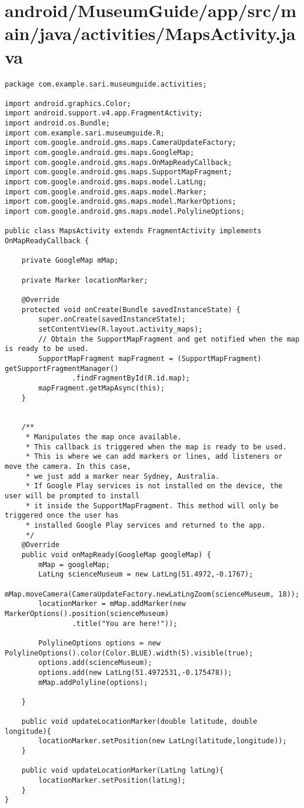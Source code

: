 \section{android/MuseumGuide/app/src/main/java/activities/MapsActivity.java}
\begin{lstlisting}package com.example.sari.museumguide.activities;

import android.graphics.Color;
import android.support.v4.app.FragmentActivity;
import android.os.Bundle;
import com.example.sari.museumguide.R;
import com.google.android.gms.maps.CameraUpdateFactory;
import com.google.android.gms.maps.GoogleMap;
import com.google.android.gms.maps.OnMapReadyCallback;
import com.google.android.gms.maps.SupportMapFragment;
import com.google.android.gms.maps.model.LatLng;
import com.google.android.gms.maps.model.Marker;
import com.google.android.gms.maps.model.MarkerOptions;
import com.google.android.gms.maps.model.PolylineOptions;

public class MapsActivity extends FragmentActivity implements OnMapReadyCallback {

    private GoogleMap mMap;

    private Marker locationMarker;

    @Override
    protected void onCreate(Bundle savedInstanceState) {
        super.onCreate(savedInstanceState);
        setContentView(R.layout.activity_maps);
        // Obtain the SupportMapFragment and get notified when the map is ready to be used.
        SupportMapFragment mapFragment = (SupportMapFragment) getSupportFragmentManager()
                .findFragmentById(R.id.map);
        mapFragment.getMapAsync(this);
    }


    /**
     * Manipulates the map once available.
     * This callback is triggered when the map is ready to be used.
     * This is where we can add markers or lines, add listeners or move the camera. In this case,
     * we just add a marker near Sydney, Australia.
     * If Google Play services is not installed on the device, the user will be prompted to install
     * it inside the SupportMapFragment. This method will only be triggered once the user has
     * installed Google Play services and returned to the app.
     */
    @Override
    public void onMapReady(GoogleMap googleMap) {
        mMap = googleMap;
        LatLng scienceMuseum = new LatLng(51.4972,-0.1767);
        mMap.moveCamera(CameraUpdateFactory.newLatLngZoom(scienceMuseum, 18));
        locationMarker = mMap.addMarker(new MarkerOptions().position(scienceMuseum)
                .title("You are here!"));

        PolylineOptions options = new PolylineOptions().color(Color.BLUE).width(5).visible(true);
        options.add(scienceMuseum);
        options.add(new LatLng(51.4972531,-0.175478));
        mMap.addPolyline(options);

    }

    public void updateLocationMarker(double latitude, double longitude){
        locationMarker.setPosition(new LatLng(latitude,longitude));
    }

    public void updateLocationMarker(LatLng latLng){
        locationMarker.setPosition(latLng);
    }
}
\end{lstlisting}
\newpage
